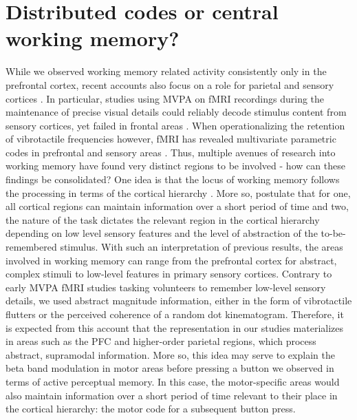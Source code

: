 \section{Distributed codes or central working memory?}
While we observed working memory related activity consistently only in the prefrontal cortex, recent accounts also focus on a role for parietal and sensory cortices \parencite{Bettencourt2015,Christophel2017,Sreenivasan2014,Xu2015}. In particular, studies using MVPA on fMRI recordings during the maintenance of precise visual details could reliably decode stimulus content from sensory cortices, yet failed in frontal areas \parencite{Christophel2012,Emrich2013,Riggall2012}. When operationalizing the retention of vibrotactile frequencies however, fMRI has revealed multivariate parametric codes in prefrontal and sensory areas \parencite{Schmidt2017,Wu2018}. Thus, multiple avenues of research into working memory have found very distinct regions to be involved - how can these findings be consolidated?
One idea is that the locus of working memory follows the processing in terms of the cortical hierarchy \parencite{Eriksson2015,Fuster2012,Zimmer2008}. More so, \textcite{Christophel2017} postulate that for one, all cortical regions can maintain information over a short period of time and two, the nature of the task dictates the relevant region in the cortical hierarchy depending on low level sensory features and the level of abstraction of the to-be-remembered stimulus. With such an interpretation of previous results, the areas involved in working memory can range from the prefrontal cortex for abstract, complex stimuli to low-level features in primary sensory cortices. Contrary to early MVPA fMRI studies tasking volunteers to remember low-level sensory details, we used abstract magnitude information, either in the form of vibrotactile flutters or the perceived coherence of a random dot kinematogram. Therefore, it is expected from this account that the representation in our studies materializes in areas such as the PFC and higher-order parietal regions, which process abstract, supramodal information. More so, this idea may serve to explain the beta band modulation in motor areas before pressing a button we observed in terms of active perceptual memory. In this case, the motor-specific areas would also maintain information over a short period of time relevant to their place in the cortical hierarchy: the motor code for a subsequent button press.
